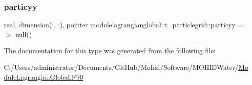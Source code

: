 \mbox{\label{structmodulelagrangianglobal_1_1t__particlegrid_ad8184a9a1cce7616dfe11b9238d6ec87}} 
\subsubsection{\texorpdfstring{particyy}{particyy}}
{\footnotesize\ttfamily real, dimension(\+:, \+:), pointer modulelagrangianglobal\+::t\+\_\+particlegrid\+::particyy =$>$ null()\hspace{0.3cm}{\ttfamily [private]}}



The documentation for this type was generated from the following file\+:\begin{DoxyCompactItemize}
\item 
C\+:/\+Users/administrator/\+Documents/\+Git\+Hub/\+Mohid/\+Software/\+M\+O\+H\+I\+D\+Water/\mbox{\hyperlink{_module_lagrangian_global_8_f90}{Module\+Lagrangian\+Global.\+F90}}\end{DoxyCompactItemize}
